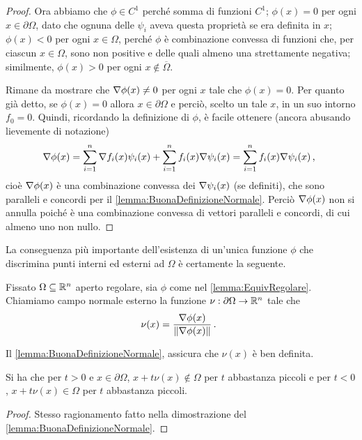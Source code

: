 \begin{proof}
	Ora abbiamo che $\phi\in C^1$ perché somma di funzioni $C^1$; $\phi(x)=0$ per ogni $x\in \partial\Omega$, dato che ognuna delle
	$\psi_i$ aveva questa proprietà se era definita in $x$;
	$\phi(x)<0$ per ogni $x \in \Omega$, perché $\phi$ è combinazione convessa di funzioni che, per ciascun $x\in\Omega$, sono non positive e
	delle quali almeno una strettamente negativa; similmente, $\phi(x)>0$ per ogni $x \notin \overline\Omega$.
	
	Rimane da mostrare che $\nabla \phi(x)\neq 0$ per ogni $x$ tale che $\phi(x)=0$. 
	Per quanto già detto, se $\phi(x)=0$ allora $x\in\partial\Omega$ e perciò, scelto un tale $x$, in un suo intorno $f_0=0$. 
	Quindi, ricordando la definizione di $\phi$, è facile ottenere (ancora abusando lievemente di notazione)
	\begin{equation*}
		\nabla\phi(x)=\sum_{i=1}^n\nabla f_i(x)\psi_i(x)+\sum_{i=1}^n f_i(x)\nabla\psi_i(x)=\sum_{i=1}^n f_i(x)\nabla\psi_i(x)\, \text{, }
	\end{equation*}
	cioè $\nabla\phi(x)$ è una combinazione convessa dei $\nabla\psi_i(x)$ (se definiti), che sono paralleli e concordi per il \cref{lemma:BuonaDefinizioneNormale}. 
	Perciò $\nabla\phi(x)$ non si annulla poiché è una combinazione convessa di vettori paralleli e concordi, di cui almeno uno non nullo.
\end{proof}

La conseguenza più importante dell'esistenza di un'unica funzione $\phi$ che discrimina punti interni ed esterni ad $\Omega$ è certamente la seguente.

\begin{definition}
	Fissato $\Omega\subseteq\mathbb R^n$ aperto regolare, sia $\phi$ come nel \cref{lemma:EquivRegolare}. Chiamiamo campo normale esterno la funzione $\nu:\partial\Omega\rightarrow \mathbb R^n$ tale che
	\[
		\nu(x)=\frac{\nabla \phi(x)}{\lVert\nabla \phi(x)\rVert}\, \text{. }
	\]
\end{definition}
\begin{remark}
	Il \cref{lemma:BuonaDefinizioneNormale}, assicura che $\nu(x)$ è ben definita.
\end{remark}

\begin{remark}
	Si ha che per $t>0$ e $x\in\partial\Omega$, $x+t\nu(x)\notin \Omega$ per $t$ abbastanza piccoli e per $t<0$, $x+t\nu(x)\in \Omega$ per $t$
	abbastanza piccoli.
\end{remark}
\begin{proof}
	Stesso ragionamento fatto nella dimostrazione del \cref{lemma:BuonaDefinizioneNormale}.
\end{proof}

